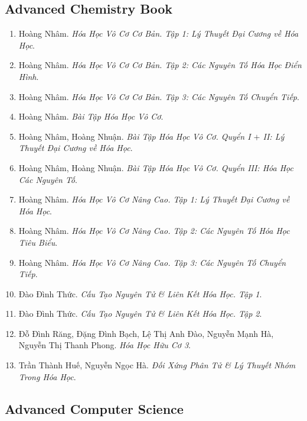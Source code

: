 \documentclass{article}
\begin{document}

\subsection{Advanced Chemistry Book}

\begin{enumerate}
	\item Hoàng Nhâm. \textit{Hóa Học Vô Cơ Cơ Bản. Tập 1: Lý Thuyết Đại Cương về Hóa Học}.
	\item Hoàng Nhâm. \textit{Hóa Học Vô Cơ Cơ Bản. Tập 2: Các Nguyên Tố Hóa Học Điển Hình}.
	\item Hoàng Nhâm. \textit{Hóa Học Vô Cơ Cơ Bản. Tập 3: Các Nguyên Tố Chuyển Tiếp}.
	\item Hoàng Nhâm. \textit{Bài Tập Hóa Học Vô Cơ}.
	\item Hoàng Nhâm, Hoàng Nhuận. \textit{Bài Tập Hóa Học Vô Cơ. Quyển I $+$ II: Lý Thuyết Đại Cương về Hóa Học}.
	\item Hoàng Nhâm, Hoàng Nhuận. \textit{Bài Tập Hóa Học Vô Cơ. Quyển III: Hóa Học Các Nguyên Tố}.
	\item Hoàng Nhâm. \textit{Hóa Học Vô Cơ Nâng Cao. Tập 1: Lý Thuyết Đại Cương về Hóa Học}.
	\item Hoàng Nhâm. \textit{Hóa Học Vô Cơ Nâng Cao. Tập 2: Các Nguyên Tố Hóa Học Tiêu Biểu}.
	\item Hoàng Nhâm. \textit{Hóa Học Vô Cơ Nâng Cao. Tập 3: Các Nguyên Tố Chuyển Tiếp}.
	\item Đào Đình Thức. \textit{Cấu Tạo Nguyên Tử \& Liên Kết Hóa Học. Tập 1}.
	\item Đào Đình Thức. \textit{Cấu Tạo Nguyên Tử \& Liên Kết Hóa Học. Tập 2}.
	\item Đỗ Đình Răng, Đặng Đình Bạch, Lệ Thị Anh Đào, Nguyễn Mạnh Hà, Nguyễn Thị Thanh Phong. \textit{Hóa Học Hữu Cơ 3}.
	\item Trần Thành Huế, Nguyễn Ngọc Hà. \textit{Đối Xứng Phân Tử \& Lý Thuyết Nhóm Trong Hóa Học}.
\end{enumerate}


\subsection{Advanced Computer Science}
\end{document}
